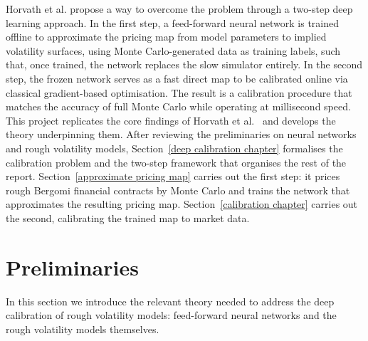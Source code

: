 \documentclass[12pt,a4paper]{article}
\theoremstyle{remark} \newtheorem{remark}[theorem]{Remark}
\begin{document}
Horvath et al. \cite{1} propose a way to overcome the problem through a two-step deep learning approach. In the first step, a feed-forward neural network is trained offline to approximate the pricing map from model parameters to implied volatility surfaces, using Monte Carlo-generated data as training labels, such that, once trained, the network replaces the slow simulator entirely. In the second step, the frozen network serves as a fast direct map to be calibrated online via classical gradient-based optimisation. The result is a calibration procedure that matches the accuracy of full Monte Carlo while operating at millisecond speed.\vspace{1em}\\

This project replicates the core findings of Horvath et al.\ \cite{1} and develops the theory underpinning them. After reviewing the preliminaries on neural networks and rough volatility models, Section~\ref{deep calibration chapter} formalises the calibration problem and the two-step framework that organises the rest of the report. Section~\ref{approximate pricing map} carries out the first step: it prices rough Bergomi financial contracts by Monte Carlo and trains the network that approximates the resulting pricing map. Section~\ref{calibration chapter} carries out the second, calibrating the trained map to market data.
\section{Preliminaries}
In this section we introduce the relevant theory needed to address the deep calibration of rough volatility models: feed-forward neural networks and the rough volatility models themselves.
\end{document}
